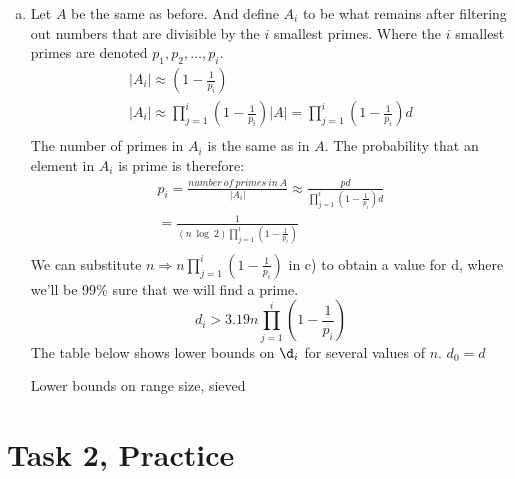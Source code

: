 \documentclass[12pt,a4paper]{article}
\begin{document}
\begin{enumerate}[a)]
    \item
    Let \(A\) be the same as before. And define \(A_i\) to be what remains after filtering out numbers that are
    divisible by the \(i\) smallest primes. Where the \(i\) smallest primes are denoted \(p_1, p_2, \dots , p_i\).
    \begin{gather*}
        |A_i| \approx \left( 1 - \frac{1}{p_i} \right)\\
        |A_i| \approx \prod_{j=1}^{i}\left( 1 - \frac{1}{p_i} \right)|A| =
    \prod_{j=1}^{i}\left( 1 - \frac{1}{p_i} \right)d\\
    \end{gather*}
    The number of primes in \(A_i\) is the same as in \(A\).
    The probability that an element in \(A_i\) is prime is therefore:
    \begin{gather*}
        p_i = \frac{number\ of\ primes\ in\ A}{|A_i|} \approx \frac{pd}{\prod_{j=1}^{i}\left( 1 - \frac{1}{p_i} \right)d}\\
        = \frac{1}{(n\ \log\ 2)\prod_{j=1}^{i}\left( 1 - \frac{1}{p_i} \right)}\\
    \end{gather*}
    We can substitute \(n \Longrightarrow n\prod_{j=1}^{i}\left( 1 - \frac{1}{p_i} \right)\) in c) to obtain a value
    for d, where we'll be 99\% sure that we will find a prime.
    \[d_i > 3.19n\prod_{j=1}^{i}\left( 1 - \frac{1}{p_i} \right)\]
    The table below shows lower bounds on \(\d_i\) for several values of \(n\). \(d_0 = d\)
        {\begin{table}[H]
             \centering
             \caption{Lower bounds on range size, sieved}
             \label{tab:sievedlowerbounds}
             
        \end{table}}
    \end{enumerate}

\section*{Task 2, Practice}
\end{document}
